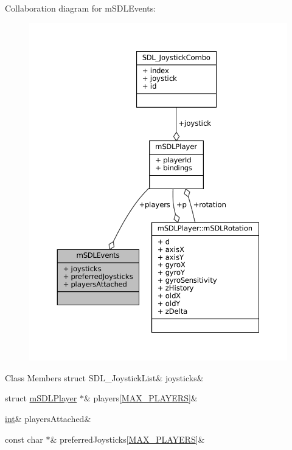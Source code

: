 Collaboration diagram for m\+S\+D\+L\+Events\+:
\nopagebreak
\begin{figure}[H]
\begin{center}
\leavevmode
\includegraphics[width=350pt]{structm_s_d_l_events__coll__graph}
\end{center}
\end{figure}
\begin{DoxyFields}{Class Members}
\mbox{\label{sdl-events_8h_afb173842539d6be419ecf3d0f7c28ed6}} 
struct SDL\_JoystickList&
joysticks&
\\
\hline

\mbox{\label{sdl-events_8h_af7de8e592c42384902bfc897c6a33fb0}} 
struct \mbox{\hyperlink{sdl-events_8h_structm_s_d_l_player}{mSDLPlayer}} $\ast$&
players\mbox{[}\mbox{\hyperlink{sdl-events_8h_a1c346c944e8204fd06dc057393c7c96d}{MAX\_PLAYERS}}\mbox{]}&
\\
\hline

\mbox{\label{sdl-events_8h_ada9d7a299c188ab37546da97f7de3fe9}} 
\mbox{\hyperlink{ioapi_8h_a787fa3cf048117ba7123753c1e74fcd6}{int}}&
playersAttached&
\\
\hline

\mbox{\label{sdl-events_8h_acc8594730dc9389fd3e3bfec9ad3651a}} 
const char $\ast$&
preferredJoysticks\mbox{[}\mbox{\hyperlink{sdl-events_8h_a1c346c944e8204fd06dc057393c7c96d}{MAX\_PLAYERS}}\mbox{]}&
\\
\hline

\end{DoxyFields}
\label{structm_s_d_l_player}
